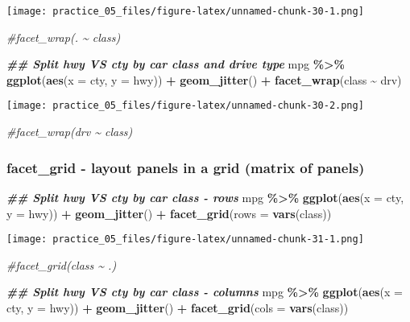 \documentclass[
]{article}
\newenvironment{Shaded}{\begin{snugshade}}{\end{snugshade}}
\newcommand{\AttributeTok}[1]{\textcolor[rgb]{0.13,0.29,0.53}{#1}}
\newcommand{\CommentTok}[1]{\textcolor[rgb]{0.56,0.35,0.01}{\textit{#1}}}
\newcommand{\DocumentationTok}[1]{\textcolor[rgb]{0.56,0.35,0.01}{\textbf{\textit{#1}}}}
\newcommand{\FunctionTok}[1]{\textcolor[rgb]{0.13,0.29,0.53}{\textbf{#1}}}
\newcommand{\NormalTok}[1]{#1}
\newcommand{\SpecialCharTok}[1]{\textcolor[rgb]{0.81,0.36,0.00}{\textbf{#1}}}
\begin{document}
\texttt{[image: practice\_05\_files/figure-latex/unnamed-chunk-30-1.png]}

\begin{Shaded}
\begin{Highlighting}[]
  \CommentTok{\#facet\_wrap(. \textasciitilde{} class)}

\DocumentationTok{\#\# Split hwy VS cty by car class and drive type}
\NormalTok{mpg }\SpecialCharTok{\%\textgreater{}\%} 
  \FunctionTok{ggplot}\NormalTok{(}\FunctionTok{aes}\NormalTok{(}\AttributeTok{x =}\NormalTok{ cty,}
             \AttributeTok{y =}\NormalTok{ hwy)) }\SpecialCharTok{+}
  \FunctionTok{geom\_jitter}\NormalTok{() }\SpecialCharTok{+}
  \FunctionTok{facet\_wrap}\NormalTok{(class }\SpecialCharTok{\textasciitilde{}}\NormalTok{ drv)}
\end{Highlighting}
\end{Shaded}

\texttt{[image: practice\_05\_files/figure-latex/unnamed-chunk-30-2.png]}

\begin{Shaded}
\begin{Highlighting}[]
  \CommentTok{\#facet\_wrap(drv \textasciitilde{} class)}
\end{Highlighting}
\end{Shaded}

\subsubsection{facet\_grid - layout panels in a grid (matrix of
panels)}\label{facet_grid---layout-panels-in-a-grid-matrix-of-panels}

\begin{Shaded}
\begin{Highlighting}[]
\DocumentationTok{\#\# Split hwy VS cty by car class {-} rows}
\NormalTok{mpg }\SpecialCharTok{\%\textgreater{}\%} 
  \FunctionTok{ggplot}\NormalTok{(}\FunctionTok{aes}\NormalTok{(}\AttributeTok{x =}\NormalTok{ cty,}
             \AttributeTok{y =}\NormalTok{ hwy)) }\SpecialCharTok{+}
  \FunctionTok{geom\_jitter}\NormalTok{() }\SpecialCharTok{+}
  \FunctionTok{facet\_grid}\NormalTok{(}\AttributeTok{rows =} \FunctionTok{vars}\NormalTok{(class))}
\end{Highlighting}
\end{Shaded}

\texttt{[image: practice\_05\_files/figure-latex/unnamed-chunk-31-1.png]}

\begin{Shaded}
\begin{Highlighting}[]
  \CommentTok{\#facet\_grid(class \textasciitilde{} .)}

\DocumentationTok{\#\# Split hwy VS cty by car class {-} columns}
\NormalTok{mpg }\SpecialCharTok{\%\textgreater{}\%} 
  \FunctionTok{ggplot}\NormalTok{(}\FunctionTok{aes}\NormalTok{(}\AttributeTok{x =}\NormalTok{ cty,}
             \AttributeTok{y =}\NormalTok{ hwy)) }\SpecialCharTok{+}
  \FunctionTok{geom\_jitter}\NormalTok{() }\SpecialCharTok{+}
  \FunctionTok{facet\_grid}\NormalTok{(}\AttributeTok{cols =} \FunctionTok{vars}\NormalTok{(class))}
\end{Highlighting}
\end{Shaded}
\end{document}
